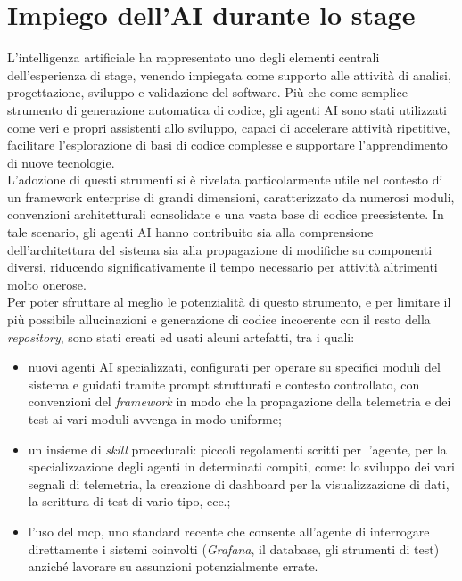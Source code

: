 \section{Impiego dell'AI durante lo stage}
\label{sec:introduction-ai}
L'intelligenza artificiale ha rappresentato uno degli elementi centrali dell'esperienza di stage, venendo impiegata come supporto alle attività di analisi, progettazione, sviluppo e validazione del software. Più che come semplice strumento di generazione automatica di codice, gli agenti AI sono stati utilizzati come veri e propri assistenti allo sviluppo, capaci di accelerare attività ripetitive, facilitare l'esplorazione di basi di codice complesse e supportare l'apprendimento di nuove tecnologie.\\
L'adozione di questi strumenti si è rivelata particolarmente utile nel contesto di un framework enterprise di grandi dimensioni, caratterizzato da numerosi moduli, convenzioni architetturali consolidate e una vasta base di codice preesistente. In tale scenario, gli agenti AI hanno contribuito sia alla comprensione dell'architettura del sistema sia alla propagazione di modifiche su componenti diversi, riducendo significativamente il tempo necessario per attività altrimenti molto onerose.\\
Per poter sfruttare al meglio le potenzialità di questo strumento, e per limitare il più possibile allucinazioni e generazione di codice incoerente con il resto della \emph{repository}, sono stati creati ed usati alcuni artefatti, tra i quali:
\begin{itemize}
      \item nuovi agenti AI specializzati, configurati per operare su specifici moduli
            del sistema e guidati tramite prompt strutturati e contesto controllato, con
            convenzioni del \emph{framework} in modo che la propagazione della telemetria e dei
            test ai vari moduli avvenga in modo uniforme;
      \item un insieme di \emph{skill} procedurali: piccoli regolamenti
            scritti per l'agente, per la specializzazione degli agenti in determinati
            compiti, come: lo sviluppo dei vari segnali di telemetria, la creazione
            di dashboard per la visualizzazione di dati, la scrittura di test di vario tipo, ecc.;
      \item l'uso del \gls{mcp}, uno standard recente
            che consente all'agente di interrogare direttamente i sistemi
            coinvolti (\emph{Grafana}, il database, gli strumenti di test)
            anziché lavorare su assunzioni potenzialmente errate.
\end{itemize}

